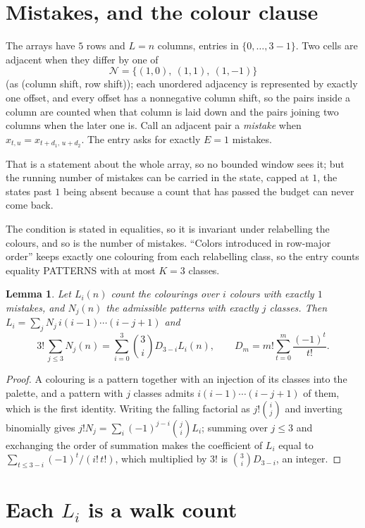 \documentclass[11pt,a4paper]{article}
\theoremstyle{plain}
\newtheorem{lemma}[theorem]{Lemma}
\theoremstyle{definition}
\begin{document}
\section{Mistakes, and the colour clause}

The arrays have $5$ rows and $L=n$ columns, entries in $\{0,\dots,3-1\}$.
Two cells are adjacent when they differ by one of
\[
\mathcal N=\{(1,0),\ (1,1),\ (1,-1)\}
\]
(as (column shift, row shift)); each unordered adjacency is represented by exactly one
offset, and every offset has a nonnegative column shift, so the pairs inside a column are
counted when that column is laid down and the pairs joining two columns when the later one
is. Call an adjacent pair a \emph{mistake} when $x_{t,u}=x_{t+d_1,\,u+d_2}$. The entry asks for exactly
$E=1$ mistakes.

That is a statement about the whole array, so no bounded window sees it; but the running
number of mistakes can be carried in the state, capped at $1$, the states past $1$ being
absent because a count that has passed the budget can never come back.

The condition is stated in equalities, so it is invariant under relabelling the colours, and
so is the number of mistakes. ``Colors introduced in row-major order'' keeps exactly one
colouring from each relabelling class, so the entry counts equality PATTERNS with at most
$K=3$ classes.

\begin{lemma}\label{lem:inv}
Let $L_i(n)$ count the colourings over $i$ colours with exactly $1$ mistakes, and $N_j(n)$
the admissible patterns with exactly $j$ classes. Then
$L_i=\sum_j N_j\,i(i-1)\cdots(i-j+1)$ and
\[
3!\,\sum_{j\le3}N_j(n)=\sum_{i=0}^{3}\binom{3}{i}D_{3-i}L_i(n),
\qquad D_m=m!\sum_{t=0}^{m}\frac{(-1)^t}{t!} .
\]
\end{lemma}

\begin{proof}
A colouring is a pattern together with an injection of its classes into the palette, and a
pattern with $j$ classes admits $i(i-1)\cdots(i-j+1)$ of them, which is the first identity.
Writing the falling factorial as $j!\binom{i}{j}$ and inverting binomially gives
$j!N_j=\sum_i(-1)^{j-i}\binom{j}{i}L_i$; summing over $j\le3$ and exchanging the order
of summation makes the coefficient of $L_i$ equal to $\sum_{t\le3-i}(-1)^t/(i!\,t!)$,
which multiplied by $3!$ is $\binom{3}{i}D_{3-i}$, an integer.
\end{proof}

\section{Each $L_i$ is a walk count}
\end{document}
